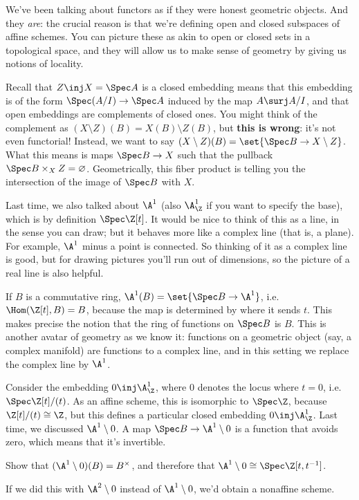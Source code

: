 We've been talking about functors as if they were honest geometric objects. And they \emph{are}: the crucial reason
is that we're defining open and closed subspaces of affine schemes. You can picture these as akin to open or closed
sets in a topological space, and they will allow us to make sense of geometry by giving us notions of locality.

Recall that $Z\inj X = \Spec A$ is a closed embedding means that this embedding is of the form $\Spec(A/I)\to\Spec
A$ induced by the map $A\surj A/I$, and that open embeddings are complements of closed ones. You might think of the
complement as $(X\setminus Z)(B) = X(B)\setminus Z(B)$, but \textbf{this is wrong}: it's not even functorial!
Instead, we want to say $(X\setminus Z)(B) = \set{\Spec B\to X\setminus Z}$. What this means is maps $\Spec B\to X$
such that the pullback $\Spec B\times_X Z = \varnothing$. Geometrically, this fiber product is telling you the
intersection of the image of $\Spec B$ with $X$.

Last time, we also talked about $\A^1$ (also $\A_\Z^1$ if you want to specify the base), which is by definition
$\Spec\Z[t]$. It would be nice to think of this as a line, in the sense you can draw; but it behaves more like a
complex line (that is, a plane). For example, $\A^1$ minus a point is connected. So thinking of it as a complex
line is good, but for drawing pictures you'll run out of dimensions, so the picture of a real line is also helpful.

If $B$ is a commutative ring, $\A^1(B) = \set{\Spec B\to\A^1}$, i.e.\ $\Hom(\Z[t], B) = B$, because the map is
determined by where it sends $t$. This makes precise the notion that the ring of functions on $\Spec B$ is $B$.
This is another avatar of geometry as we know it: functions on a geometric object (say, a complex manifold) are
functions to a complex line, and in this setting we replace the complex line by $\A^1$.

Consider the embedding $0\inj\A_\Z^1$, where $0$ denotes the locus where $t = 0$, i.e.\ $\Spec\Z[t]/(t)$. As an
affine scheme, this is isomorphic to $\Spec\Z$, because $\Z[t]/(t)\cong\Z$, but this defines a particular closed
embedding $0\inj\A_\Z^1$. Last time, we discussed $\A^1\setminus 0$. A map $\Spec B\to\A^1\setminus 0$ is a
function that avoids zero, which means that it's invertible.
\begin{ex}
Show that $(\A^1\setminus 0)(B) = B^\times$, and therefore that $\A^1\setminus 0 \cong \Spec\Z[t,t^{-1}]$.
\end{ex}
If we did this with $\A^2\setminus 0$ instead of $\A^1\setminus 0$, we'd obtain a nonaffine scheme.

